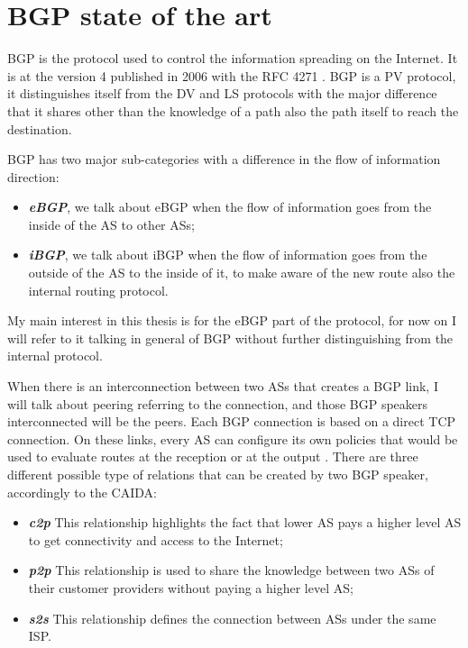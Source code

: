 \chapter{BGP state of the art}
\label{cha:bgp_art}

\ac{BGP} is the protocol used to control the information spreading on the Internet.
It is at the version \num{4} published in \num{2006} with the \ac{RFC} \num{4271}
\cite{rfc4271}.
\ac{BGP} is a \ac{PV} protocol, it distinguishes itself from the \ac{DV} and \ac{LS}
protocols with the major difference that it shares other than the knowledge of
a path also the path itself to reach the destination.

\ac{BGP} has two major sub-categories with a difference in the flow of information
direction:
\begin{itemize}
	\item \textbf{\textit{\ac{eBGP}}}, we talk about \ac{eBGP} when the
		flow of information goes from the inside
		of the \ac{AS} to other \acp{AS};
	\item \textbf{\textit{\ac{iBGP}}}, we talk about \ac{iBGP} when the flow
		of information goes from the outside of the \ac{AS} to the inside of
		it, to make aware of the new route also the internal routing protocol.
\end{itemize}

My main interest in this thesis is for the \ac{eBGP} part of the protocol, for
now on I will refer to it talking in general of \ac{BGP} without further distinguishing
from the internal protocol.

When there is an interconnection between two \acp{AS} that creates a \ac{BGP}
link, I will talk about peering referring to the connection, and those \ac{BGP} 
speakers interconnected will be the peers.
Each \ac{BGP} connection is based on a direct \ac{TCP} connection.
On these links, every \ac{AS} can configure its own policies that would be used
to evaluate routes at the reception or at the output .
There are three different possible type of relations that can be created by two
\ac{BGP} speaker, accordingly to the \ac{CAIDA}:

\begin{itemize}
	\item \textbf{\textit{\ac{c2p}}} This relationship highlights the fact that
		lower \ac{AS} pays a higher level \ac{AS} to get connectivity and access
		to the Internet;
	\item \textbf{\textit{\ac{p2p}}} This relationship is used to share the knowledge
		between two \acp{AS} of their customer providers without paying a higher
		level \ac{AS};
	\item \textbf{\textit{\ac{s2s}}} This relationship defines the connection 
		between \acp{AS} under the same \ac{ISP}.
\end{itemize}

